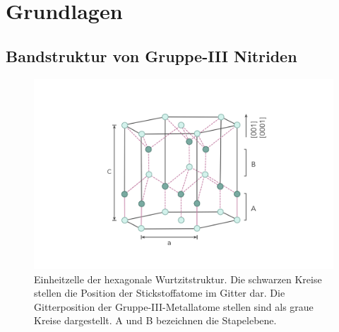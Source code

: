 \chapter{Grundlagen}
\thispagestyle{fancy}

\section{Bandstruktur von Gruppe-III Nitriden}
\begin{figure}[!htb]
    \centering
    \begin{minipage}[t]{\linewidth}
        \centering
        \includegraphics[width=0.7\linewidth]{Bilder/Wurtzite.png}
        \caption{Einheitzelle der hexagonale Wurtzitstruktur. Die schwarzen Kreise stellen die Position der Stickstoffatome im Gitter dar. Die Gitterposition der Gruppe-III-Metallatome stellen sind als graue Kreise dargestellt. A und B bezeichnen die Stapelebene.  }
        \label{fig:wurtz}
    \end{minipage}%
\end{figure}
\vspace{1cm}
\raggedright


